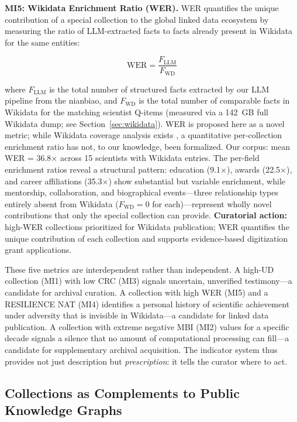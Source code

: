 \documentclass[review]{elsarticle}
\begin{document}
\textbf{MI5: Wikidata Enrichment Ratio (WER).} WER quantifies the unique contribution of a special collection to the global linked data ecosystem by measuring the ratio of LLM-extracted facts to facts already present in Wikidata for the same entities:

\begin{equation}
\text{WER} = \frac{F_{\text{LLM}}}{F_{\text{WD}}}
\end{equation}

where $F_{\text{LLM}}$ is the total number of structured facts extracted by our LLM pipeline from the nianbiao, and $F_{\text{WD}}$ is the total number of comparable facts in Wikidata for the matching scientist Q-items (measured via a 142~GB full Wikidata dump; see Section~\ref{sec:wikidata}). WER is proposed here as a novel metric; while Wikidata coverage analysis exists \cite{allisoncassin2018wikidata}, a quantitative per-collection enrichment ratio has not, to our knowledge, been formalized. Our corpus: mean WER = 36.8$\times$ across 15 scientists with Wikidata entries. The per-field enrichment ratios reveal a structural pattern: education (9.1$\times$), awards (22.5$\times$), and career affiliations (35.3$\times$) show substantial but variable enrichment, while mentorship, collaboration, and biographical events---three relationship types entirely absent from Wikidata ($F_{\text{WD}} = 0$ for each)---represent wholly novel contributions that only the special collection can provide. \textbf{Curatorial action:} high-WER collections prioritized for Wikidata publication; WER quantifies the unique contribution of each collection and supports evidence-based digitization grant applications.

These five metrics are interdependent rather than independent. A high-UD collection (MI1) with low CRC (MI3) signals uncertain, unverified testimony---a candidate for archival curation. A collection with high WER (MI5) and a RESILIENCE NAT (MI4) identifies a personal history of scientific achievement under adversity that is invisible in Wikidata---a candidate for linked data publication. A collection with extreme negative MBI (MI2) values for a specific decade signals a silence that no amount of computational processing can fill---a candidate for supplementary archival acquisition. The indicator system thus provides not just description but \textit{prescription}: it tells the curator where to act.

\subsection{Collections as Complements to Public Knowledge Graphs}
\end{document}
